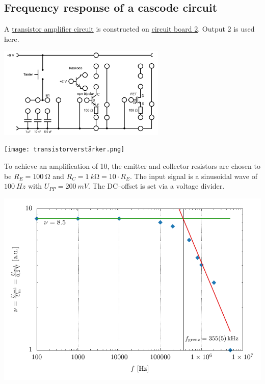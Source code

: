 \documentclass[a4paper,10pt]{article}
\newenvironment{Figure}
  {\par\medskip\noindent\minipage{\linewidth}}
  {\endminipage\par\medskip} %
\numberwithin{equation}{section}
\begin{document}
\begin{multicols}{2}
	\subsection{Frequency response of a cascode circuit}
	A \hyperref[fig:transistorverstärker]{transistor amplifier circuit} is constructed on \hyperref[fig:schaltbrett_2]{circuit board 2}.
	Output 2 is used here.
	\begin{Figure}
		\centering
		\includegraphics[width=0.6\textwidth]{schaltbrett_2.png}
		 \label{fig:schaltbrett_2}
	\end{Figure}
	\begin{Figure}
		\centering
		\texttt{[image: transistorverstärker.png]}
		 \label{fig:transistorverstärker}
	\end{Figure}
	To achieve an amplification of 10, the emitter and collector resistors are chosen to be $R_E=\SI{100}{\ohm}$ and $R_C=\SI{1}{k\ohm}=10\cdot R_E$.
	The input signal is a sinusoidal wave of $\SI{100}{Hz}$ with $U_{PP}=\SI{200}{mV}$.
	The DC--offset is set via a voltage divider.
	\begin{Figure}
		\centering
		\includegraphics[width=\textwidth]{../plot/ex4_crop.pdf}

\end{Figure}
\end{multicols}
\end{document}
